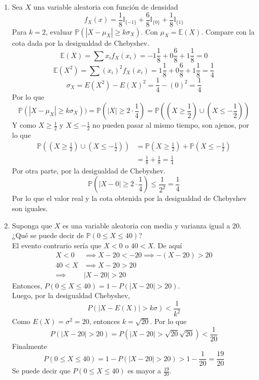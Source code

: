 \documentclass[12pt,a4paper]{report}
\begin{document}
\begin{enumerate}
{\begin{enumerate}
				\item {
					Sea $X$ una variable aleatoria con función de densidad
					\[
					f_X(x) = \frac{1}{8}\mathbb{I}_{\{-1\}} +
					\frac{6}{8}\mathbb{I}_{\{0\}} +
					\frac{1}{8}\mathbb{I}_{\{1\}}
					\]
					Para $k = 2$, evaluar
					$\mathbb{P}(|X-\mu_X| \geq k\sigma_X)$. Con
					$\mu_X = \mathbb{E}(X)$. Compare con la cota dada por la
					desigualdad de Chebyshev.
					\[\mathbb{E}(X) = \sum{x_i f_X(x_i)} = -1\frac{1}{8}
					+ 0 \frac{6}{8} + 1 \frac{1}{8} = 0\]
					\[\mathbb{E}(X^2) = \sum{(x_i)^2 f_X(x_i)} = 1\frac{1}{8}
					+ 0 \frac{6}{8} + 1 \frac{1}{8} = \frac{1}{4}\]
					\[\sigma_X = E(X^2) - E(X)^2 = \frac{1}{4} - (0)^2 = \frac{1}{4}\]
					Por lo que
					\[\mathbb{P}(|X-\mu_X| \geq k\sigma_X)) =
					\mathbb{P}(|X| \geq 2 \cdot \frac{1}{4})
					= \mathbb{P}((X \geq \frac{1}{2}) \cup (X \leq -\frac{1}{2}))\]
					Y como $X \geq \frac{1}{2}$ y $X \leq -\frac{1}{2}$ no
					pueden pasar al mismo tiempo, son ajenos, por lo que
					\begin{align*}
						\mathbb{P}((X \geq \frac{1}{2}) \cup (X \leq -\frac{1}{2}))
						&= \mathbb{P}(X \geq \frac{1}{2})
						+ \mathbb{P}(X \leq -\frac{1}{2})\\
						&= \frac{1}{8} + \frac{1}{8} = \frac{1}{4}
					\end{align*}
					Por otra parte, por la desigualdad de Chebyshev.
					\[\mathbb{P}(|X-0| \geq 2 \cdot \frac{1}{4}) \leq \frac{1}{2^2}
					= \frac{1}{4} \]
					Por lo que el valor real y la cota obtenida por la
					desigualdad de Chebyshev son iguales.
				}

				\item {
					Suponga que $X$ es una variable aleatoria con media y
					varianza igual a 20. ¿Qué se puede decir de
					$\mathbb{P}(0 \leq X \leq 40)$?\\
					El evento contrario sería que $X < 0$ o $40 < X$. De aquí
					\begin{align*}
						X < 0 &\implies X - 20 < -20 \implies -(X-20) > 20\\
						40 < X &\implies X - 20 > 20\\
						\implies &|X-20|>20
					\end{align*}
					Entonces, $P(0 \leq X \leq 40) = 1 - P(|X-20|>20)$.\\
					Luego, por la desigualdad Chebyshev,
					\[P(|X-E(X)| > k\sigma) < \frac{1}{k^2}\]
					Como $E(X) = \sigma ^2 = 20$, entonces $k=\sqrt{20}$.
					Por lo que
					\[P(|X-20| > 20)  = P(|X-20| > \sqrt{20}\sqrt{20}) <
					\frac{1}{20}\]
					Finalmente
					\[P(0 \leq X \leq 40) = 1 - P(|X-20| > 20)
					> 1 - \frac{1}{20} = \frac{19}{20}\]
					Se puede decir que $P(0 \leq X \leq 40)$ es mayor a
					$\frac{19}{20}$.
				}
			\end{enumerate}
		}


\end{enumerate}
\end{document}

